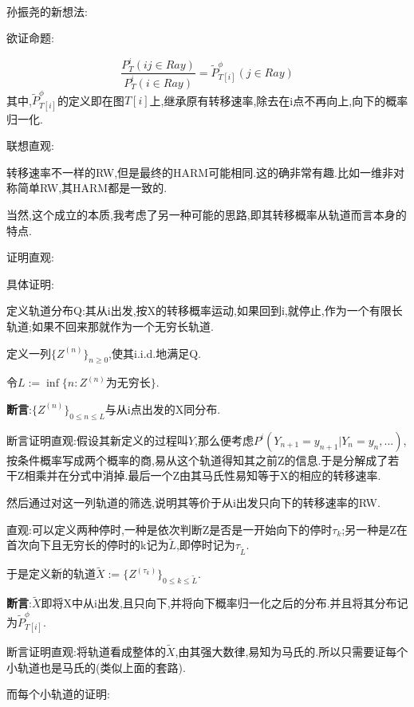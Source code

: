 		 \begin{pf}[temp孙振尧证明]
		 	\label{sun}
		 	\ 

		 	孙振尧的新想法:

		 	欲证命题:

		 		$$\displaystyle\frac
		 		{P^i_T(ij \in Ray)}
		 		{P^i_T(i \in Ray)}
		 		=
		 		\tilde{P}^{\phi}_{T[i]}(j \in Ray)
		 		$$
		 		其中,$\tilde{P}^{\phi}_{T[i]}$的定义即在图$T[i]$上,继承原有转移速率,除去在i点不再向上,向下的概率归一化.
			
			联想直观:
				
				转移速率不一样的RW,但是最终的HARM可能相同.这的确非常有趣.比如一维非对称简单RW,其HARM都是一致的.

				当然,这个成立的本质,我考虑了另一种可能的思路,即其转移概率从轨道而言本身的特点.
			
			证明直观:



			具体证明:
			
				定义轨道分布Q:其从i出发,按X的转移概率运动,如果回到i,就停止,作为一个有限长轨道;如果不回来那就作为一个无穷长轨道.

				定义一列$\{Z^{(n)}\}_{n \ge 0}$,使其i.i.d.地满足Q.

				令$L := \inf\{n: Z^{(n)}\mbox{为无穷长}\}$.

				\qquad \textbf{断言}:$\{Z^{(n)}\}_{0 \le n \le L}$与从i点出发的X同分布.
				
					断言证明直观:假设其新定义的过程叫$Y$,那么便考虑$P^i(Y_{n+1}=y_{n+1}|Y_n=y_n,...)$,按条件概率写成两个概率的商,易从这个轨道得知其之前Z的信息.于是分解成了若干Z相乘并在分式中消掉.最后一个Z由其马氏性易知等于X的相应的转移速率.
					

				
				然后通过对这一列轨道的筛选,说明其等价于从i出发只向下的转移速率的RW.
				
					直观:可以定义两种停时,一种是依次判断Z是否是一开始向下的停时$\tau_k$;另一种是Z在首次向下且无穷长的停时的k记为$\tilde{L}$,即停时记为$\tau_{\tilde{L}}$.

					于是定义新的轨道$\tilde{X} := \{Z^{(\tau_k)}\}_{0 \le k \le \tilde{L}}$.

				\qquad \textbf{断言}:$\tilde{X}$即将X中从i出发,且只向下,并将向下概率归一化之后的分布.并且将其分布记为$\tilde{P}^{\phi}_{T[i]}$.

					断言证明直观:将轨道看成整体的$\tilde{X}$,由其强大数律,易知为马氏的.所以只需要证每个小轨道也是马氏的(类似上面的套路).

					而每个小轨道的证明:


\end{pf}

